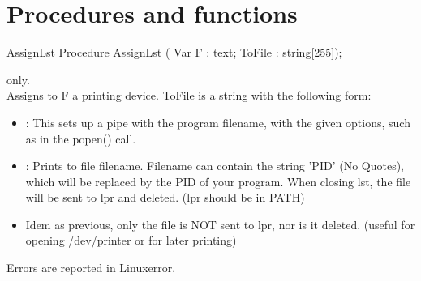 \section {Procedures and functions}
\begin{procedure}{AssignLst}
\Declaration
Procedure AssignLst  ( Var F : text; ToFile : string[255]);

\Description
 \linux only. \\
 Assigns to F a printing device. ToFile is a string with the following form:
\begin{itemize}
\item {}  : This sets up a pipe with the program filename,
             with the given options, such as in the popen() call.
\item {} : Prints to file filename. Filename can contain the string 'PID'
              (No Quotes), which will be replaced by the PID of your program.
              When closing lst, the file will be sent to lpr and deleted.
              (lpr should be in PATH)
                
\item {} Idem as previous, only the file is NOT sent to lpr, nor is it
             deleted.
             (useful for opening /dev/printer or for later printing)
\end{itemize}

\Errors
 Errors are reported in Linuxerror.
\SeeAlso
{}
\end{procedure}


